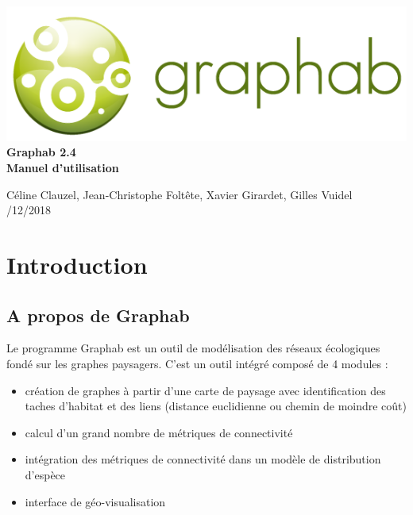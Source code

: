 \documentclass{article}
\begin{document}
 \begin{titlepage}
	
	\centering
	\includegraphics[scale=0.5]{img/logo.png}\\
	
	\bigskip
	\bigskip
	\bigskip	
	{\Huge
		\bfseries
		Graphab 2.4\\
		\bigskip
		Manuel d’utilisation\\
	}
	\bigskip
	\bigskip
	\bigskip
	\bigskip
	\bigskip
	
	{\Large		
		Céline Clauzel, Jean-Christophe Foltête, Xavier Girardet, Gilles Vuidel\\
		/12/2018\\
	}
	
\end{titlepage}

\setcounter{tocdepth}{2}
\tableofcontents

\pagebreak

\section{Introduction}

\subsection{A propos de Graphab}

Le programme Graphab est un outil de modélisation des réseaux écologiques fondé sur les graphes paysagers. C'est un outil intégré composé de 4 modules : 
\begin{itemize}
	\item création de graphes à partir d'une carte de paysage avec identification des taches d'habitat et des liens (distance euclidienne ou chemin de moindre coût)
	\item calcul d'un grand nombre de métriques de connectivité
	\item intégration des métriques de connectivité dans un modèle de distribution d’espèce
	\item interface de géo-visualisation
\end{itemize}
\end{document}
